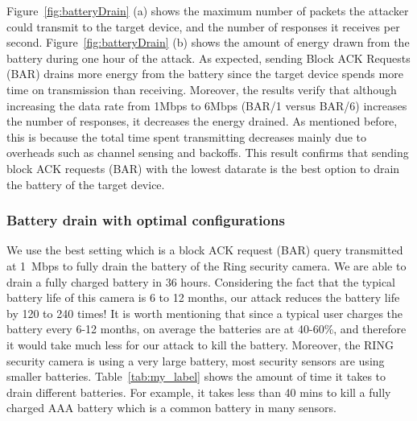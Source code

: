 Figure~\ref{fig:batteryDrain} (a) shows the maximum number of packets the attacker could transmit to the target device, and the number of responses it receives per second. Figure~\ref{fig:batteryDrain} (b) shows the amount of energy drawn from the battery during one hour of the attack. As expected, sending Block ACK Requests (BAR) drains more energy from the battery since the target device spends more time on transmission than receiving. Moreover, the results verify that although increasing the data rate from 1Mbps to 6Mbps (BAR/1 versus BAR/6) increases the number of responses, it decreases the energy drained. As mentioned before, this is because the total time spent transmitting decreases mainly due to overheads such as channel sensing and backoffs. This result confirms that sending block ACK requests (BAR) with the lowest datarate is the best option to drain the battery of the target device. 











\subsubsection{Battery drain with optimal configurations}
We use the best setting which is a block ACK request (BAR) query transmitted at 1~Mbps to fully drain the battery of the Ring security camera. We are able to drain a fully charged battery in 36 hours. Considering the fact that the typical battery life of this camera is 6 to 12 months, our attack reduces the battery life by 120 to 240 times! It is worth mentioning that since a typical user charges the battery every 6-12 months, on average the batteries are at 40-60\%, and therefore it would take much less for our attack to kill the battery. Moreover, the RING security camera is using a very large battery, most security sensors are using smaller batteries. Table~\ref{tab:my_label} shows the amount of time it takes to drain different batteries. For example, it takes less than 40 mins to kill a fully charged AAA battery which is a common battery in many sensors.  






